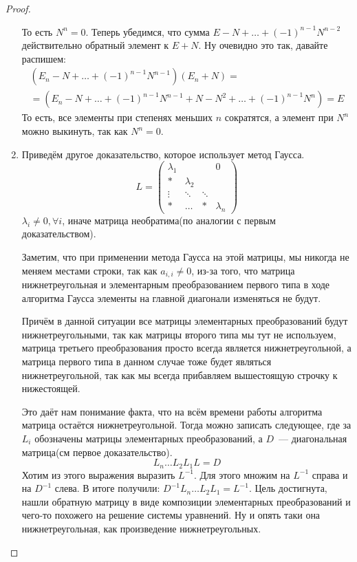 \begin{proof}
\begin{enumerate}
            То есть $N^n = 0$.  Теперь убедимся, что сумма  $E - N + \dots + (-1)^{n-1}N^{n-2}$ действительно обратный элемент
            к  $E + N$. Ну очевидно это так, давайте распишем:
            \[
                \begin{gathered}
                    \left(E_n - N + \dots + (-1)^{n-1}N^{n-1}\right)(E_n + N)=\\=
                    \left(E_n - N + \dots + (-1)^{n-1}N^{n-1} + N - N^2 + \dots + (-1)^{n-1}N^n\right)= E
                \end{gathered}
            \]
            То есть, все элементы при степенях меньших $n$ сократятся, а элемент при $N^n$ можно 
            выкинуть, так как $N^n = 0$.
        \item
            Приведём другое доказательство, которое использует метод Гаусса.\\
             \[
            L = 
            \begin{pmatrix}
                \lambda_1&&&0\\
                *&\lambda_2&&\\
                \vdots&\ddots&\ddots&\\
                *&\dots&*&\lambda_n
            \end{pmatrix}
             \] 
             $\lambda_i \not= 0,\forall i$, иначе матрица необратима(по аналогии с первым доказательством).

             Заметим, что при применении метода Гаусса на этой матрицы, мы никогда не
             меняем местами строки, так как $a_{i,i} \not= 0$, из-за того, что матрица
             нижнетреугольная и элементарным преобразованием первого типа в ходе алгоритма
             Гаусса элементы на главной диагонали изменяться не будут.

             Причём в данной ситуации все матрицы элементарных преобразований будут нижнетреугольными, 
             так как матрицы второго типа мы тут не используем, матрица третьего преобразования просто всегда
             является нижнетреугольной, а матрица первого типа в данном случае тоже будет являться нижнетреугольной,
             так как мы всегда прибавляем вышестоящую строчку к нижестоящей.

             Это даёт нам понимание факта, что на всём времени работы алгоритма матрица остаётся нижнетреугольной.
             Тогда можно записать следующее, где за $L_i$ обозначены матрицы элементарных преобразований, а 
             $D$~--- диагональная матрица(см первое доказательство).
             \[
                 L_n\ldots L_2L_1L=D
             \]
             Хотим из этого выражения выразить $L^{-1}$. Для этого множим на $L^{-1}$ справа
             и на $D^{-1}$ слева. В итоге получили: $D^{-1}L_n\ldots L_2L_1 = L^{-1}$.
             Цель достигнута, нашли обратную матрицу в виде композиции элементарных преобразований и чего-то похожего на решение
             системы уравнений. Ну и опять таки она нижнетреугольная, как произведение нижнетреугольных.
    \end{enumerate}
\end{proof}
